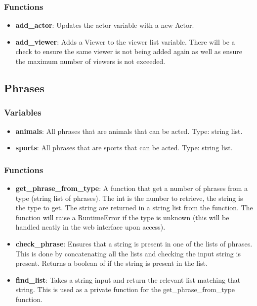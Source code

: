 \documentclass{article}
\begin{document}
\subsubsection{Functions}
\begin{itemize}

	\item \textbf{add\_actor}: Updates the actor variable with a new Actor.
	
	\item \textbf{add\_viewer}: Adds a Viewer to the viewer list variable. There will be a check to ensure the same viewer is not being added again as well as ensure the maximum number of viewers is not exceeded.
	
\end{itemize}

\subsection{Phrases}
\subsubsection{Variables}
\begin{itemize}

	\item \textbf{animals}: All phrases that are animals that can be acted. Type: string list.
	
	\item \textbf{sports}: All phrases that are sports that can be acted. Type: string list.
	
\end{itemize}

\subsubsection{Functions}
\begin{itemize}
	
	\item \textbf{get\_phrase\_from\_type}: A function that get a number of phrases from a type (string list of phrases). The int is the number to retrieve, the string is the type to get. The string are returned in a string list from the function. The function will raise a RuntimeError if the type is unknown (this will be handled neatly in the web interface upon access).
	
	\item \textbf{check\_phrase}: Ensures that a string is present in one of the lists of phrases. This is done by concatenating all the lists and checking the input string is present. Returns a boolean of if the string is present in the list.
	
	\item \textbf{find\_list}: Takes a string input and return the relevant list matching that string. This is used as a private function for the get\_phrase\_from\_type function.
	
\end{itemize}
\end{document}
